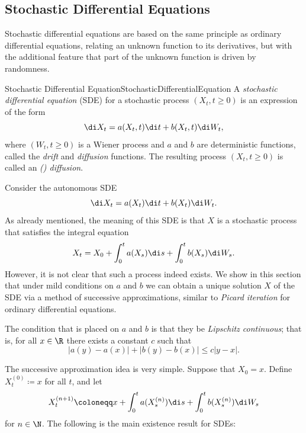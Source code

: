 \clearpage
\subsection{Stochastic Differential Equations}\label{sec:StochasticDifferentialEquations}
Stochastic differential equations are based on the same principle as ordinary differential equations, relating an unknown function to its derivatives, but with the additional feature that part of the unknown function is driven by randomness.

\begin{defn}{Stochastic Differential Equation}{StochasticDifferentialEquation}
	A \textit{stochastic differential equation} (SDE) for a stochastic process $(X_t, t \ge 0)$ is an expression of the form
	\begin{equation}
		\di X_t = a(X_t, t) \di t + b(X_t, t) \di W_t,
		\label{eq:StochasticDifferentialEquationForm}
	\end{equation}
	where $(W_t, t \ge 0)$ is a Wiener process and $a$ and $b$ are deterministic functions, called the \textit{drift} and \textit{diffusion} functions. The resulting process $(X_t, t \ge 0)$ is called an \textit{(\Ito) diffusion}.
\end{defn}

Consider the autonomous SDE
\begin{equation}
	\di X_t = a(X_t) \di t + b(X_t) \di W_t.
	\label{eq:AutonomousSDE}
\end{equation}
As already mentioned, the meaning of this SDE is that $X$ is a stochastic process that satisfies the integral equation
\begin{equation}
	X_t = X_0 + \int_0^t a(X_s) \di s + \int_0^t b(X_s) \di W_s.
	\label{eq:StochasticIntegralEquation}
\end{equation}
However, it is not clear that such a process indeed exists. We show in this section that under mild conditions on $a$ and $b$ we can obtain a unique solution $X$ of the SDE via a method of successive approximations, similar to \textit{Picard iteration} for ordinary differential equations.

The condition that is placed on $a$ and $b$ is that they be \textit{Lipschitz continuous}; that is, for all $x \in \R$ there exists a constant $c$ such that
\begin{equation}
	|a(y) - a(x)| + |b(y) - b(x)| \le c|y - x|.
	\label{eq:LipschitzCondition1D}
\end{equation}

The successive approximation idea is very simple. Suppose that $X_0 = x$. Define $X_t^{(0)} \coloneqq x$ for all $t$, and let
\begin{equation}
	X_t^{(n+1)} \coloneqq x + \int_0^t a(X_s^{(n)}) \di s + \int_0^t b(X_s^{(n)}) \di W_s
	\label{eq:SuccessiveApproximation}
\end{equation}
for $n \in \N$. The following is the main existence result for SDEs:

